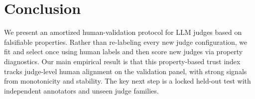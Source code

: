 \documentclass{article}
\begin{document}
\section{Conclusion}
We present an amortized human-validation protocol for LLM judges based on falsifiable properties.
Rather than re-labeling every new judge configuration, we fit and select once using human labels and then score new judges via property diagnostics.
Our main empirical result is that this property-based trust index tracks judge-level human alignment on the validation panel, with strong signals from monotonicity and stability.
The key next step is a locked held-out test with independent annotators and unseen judge families.









\end{document}
